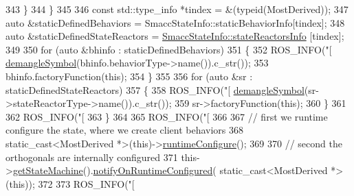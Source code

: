 \begin{DoxyCode}
{{{{343           \}
344         \}
345 
346         \textcolor{keyword}{const} std::type\_info *tindex = &(\textcolor{keyword}{typeid}(MostDerived));
347         \textcolor{keyword}{auto} &staticDefinedBehaviors = SmaccStateInfo::staticBehaviorInfo[tindex];
348         \textcolor{keyword}{auto} &staticDefinedStateReactors = \hyperlink{classsmacc_1_1introspection_1_1SmaccStateInfo_abd1d6ca5060c87f6bd11fde3e5b2ac4d}{SmaccStateInfo::stateReactorsInfo}
      [tindex];
349 
350         \textcolor{keywordflow}{for} (\textcolor{keyword}{auto} &bhinfo : staticDefinedBehaviors)
351         \{
352           ROS\_INFO(\textcolor{stringliteral}{"[%
      \hyperlink{namespacesmacc_1_1introspection_a2f495108db3e57604d8d3ff5ef030302}{demangleSymbol}(bhinfo.behaviorType->name()).c\_str());
353           bhinfo.factoryFunction(\textcolor{keyword}{this});
354         \}
355 
356         \textcolor{keywordflow}{for} (\textcolor{keyword}{auto} &sr : staticDefinedStateReactors)
357         \{
358           ROS\_INFO(\textcolor{stringliteral}{"[%
      \hyperlink{namespacesmacc_1_1introspection_a2f495108db3e57604d8d3ff5ef030302}{demangleSymbol}(sr->stateReactorType->name()).c\_str());
359           sr->factoryFunction(\textcolor{keyword}{this});
360         \}
361 
362         ROS\_INFO(\textcolor{stringliteral}{"[%
363       \}
364 
365       ROS\_INFO(\textcolor{stringliteral}{"[%
366 
367       \textcolor{comment}{// first we runtime configure the state, where we create client behaviors}
368       \textcolor{keyword}{static\_cast<}MostDerived *\textcolor{keyword}{>}(\textcolor{keyword}{this})->\hyperlink{classsmacc_1_1SmaccState_a6995704a0232e24f4c38250302c0a01f}{runtimeConfigure}();
369 
370       \textcolor{comment}{// second the orthogonals are internally configured}
371       this->\hyperlink{classsmacc_1_1SmaccState_afc39f8e0ca4001b2159a100da2fccd0e}{getStateMachine}().\hyperlink{classsmacc_1_1ISmaccStateMachine_a7377ca0f79289fdc27f9ed3ff6e67263}{notifyOnRuntimeConfigured}(
      static\_cast<MostDerived *>(\textcolor{keyword}{this}));
372 
373       ROS\_INFO(\textcolor{stringliteral}{"[%
}}}}}}}}}
\end{DoxyCode}
